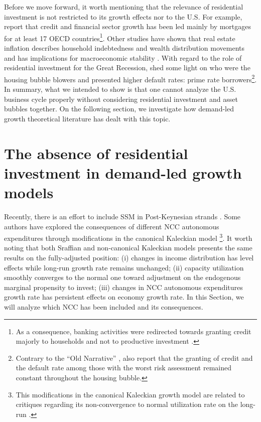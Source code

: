 \documentclass[11pt]{article}
\begin{document}
Before we move forward, it worth mentioning that the relevance of residential investment is not restricted to its growth effects nor to the U.S. 
For example, \textcite{jorda_great_2016} report that credit and financial sector growth has been led mainly by mortgages for at least 17 OECD countries\footnote{As a consequence, banking activities were redirected towards granting credit majorly to households and not to productive investment \cites{erturk_banks_2007}{kohl_more_2018}.}. 
Other studies have shown that real estate inflation describes household indebtedness and wealth distribution movements and has implications for macroeconomic stability \cites{ryoo_household_2016}{stockhammer_debt-driven_2016}{barnes_private_2016}{johnston_global_2017}{mian_household_2017}{anderson_politics_2020}{fuller_housing_2020}. 
With regard to the role of residential investment for the Great Recession, \textcite{albanesi_credit_2017} shed some light on who were the housing bubble blowers and presented higher default rates: prime rate borrowers\footnote{Contrary to the ``Old Narrative'' \cite{mian_consequences_2009},  \textcite{albanesi_credit_2017}  also report that the granting of credit and the default rate among those with the worst risk assessment remained constant throughout the housing bubble.}.
In summary, what we intended to show is that one cannot analyze the U.S. business cycle properly without considering residential investment and asset bubbles together.
On the following section, we investigate how demand-led growth theoretical literature has dealt with this topic.


\section{The absence of residential investment in demand-led growth models}
\label{sec:orged18d9c}
\label{sec:Review}
Recently, there is an effort to include SSM in Post-Keynesian strands \cite{lavoie_post-keynesian_2015}.
Some authors have explored the consequences of  different NCC autonomous expenditures through modifications in the canonical Kaleckian model \cites{allain_tackling_2015}{lavoie_convergence_2016}\footnote{This modifications in the canonical Kaleckian growth model are related to critiques regarding its non-convergence to normal utilization rate on the long-run \cites{dallery_conflicting_2011}{skott_theoretical_2012}{hein_harrodian_2012}.}.
It worth noting that both Sraffian and non-canonical Kaleckian models presents the same results on the fully-adjusted position:
(i) changes in income distribution has level effects while long-run growth rate remains unchanged;
(ii) capacity utilization smoothly converges to the normal one toward adjustment on the endogenous marginal propensity to invest;
(iii) changes in NCC autonomous expenditures growth rate has persistent effects on economy growth rate.
In this Section, we will analyze which NCC has been included and its consequences.
\end{document}
